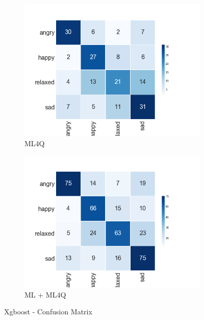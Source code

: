 \begin{figure}[H]
  \centering
  \begin{subfigure}[b]{0.49\linewidth}
    \includegraphics[width=\linewidth]{./chapters/chapter4/images/4Q/CM_XGB.png}
    \caption{ML4Q}
  \end{subfigure}
  \begin{subfigure}[b]{0.49\linewidth}
   \includegraphics[width=\linewidth]{./chapters/chapter4/images/join/CM_XGB.png}
    \caption{ML + ML4Q}
  \end{subfigure}
  \caption{Xgboost - Confusion Matrix}
  \label{fig:xgb}
\end{figure}
